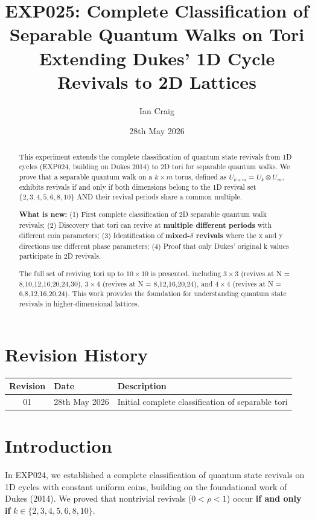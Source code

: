 \documentclass[12pt]{article}
\title{EXP025: Complete Classification of Separable Quantum Walks on Tori \\ 
       \large Extending Dukes' 1D Cycle Revivals to 2D Lattices}
\author{Ian Craig}
\date{28th May 2026}
\begin{document}
\maketitle

\begin{abstract}
This experiment extends the complete classification of quantum state revivals from 1D cycles (EXP024, building on Dukes 2014) to 2D tori for separable quantum walks. We prove that a separable quantum walk on a \(k \times m\) torus, defined as \(U_{k \times m} = U_k \otimes U_m\), exhibits revivals if and only if both dimensions belong to the 1D revival set \(\{2,3,4,5,6,8,10\}\) AND their revival periods share a common multiple. 

\textbf{What is new:} (1) First complete classification of 2D separable quantum walk revivals; (2) Discovery that tori can revive at \textbf{multiple different periods} with different coin parameters; (3) Identification of \textbf{mixed-\(\delta\) revivals} where the x and y directions use different phase parameters; (4) Proof that only Dukes' original k values participate in 2D revivals. 

The full set of reviving tori up to \(10 \times 10\) is presented, including \(3 \times 3\) (revives at N = 8,10,12,16,20,24,30), \(3 \times 4\) (revives at N = 8,12,16,20,24), and \(4 \times 4\) (revives at N = 6,8,12,16,20,24). This work provides the foundation for understanding quantum state revivals in higher-dimensional lattices.
\end{abstract}

\section*{Revision History}

\begin{table}[h!]
\centering
\begin{tabular}{cll}
\toprule
\textbf{Revision} & \textbf{Date} & \textbf{Description} \\
\midrule
01 & 28th May 2026 & Initial complete classification of separable tori \\
\bottomrule
\end{tabular}
\end{table}

\section{Introduction}

In EXP024, we established a complete classification of quantum state revivals on 1D cycles with constant uniform coins, building on the foundational work of Dukes (2014). We proved that nontrivial revivals (\(0<\rho<1\)) occur \textbf{if and only if} \(k \in \{2, 3, 4, 5, 6, 8, 10\}\).
\end{document}
